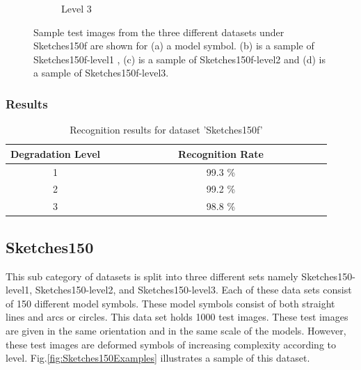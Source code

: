 \begin{figure}[h]
\begin{subfigure}[b]{0.25\textwidth}
                \caption{Level 3}
        \end{subfigure}
        \caption[Sample data from 'Sketches150f' dataset]{Sample test images from the three different datasets under Sketches150f are shown for (a) a model symbol. (b) is a sample of Sketches150f-level1 , (c)  is a sample of Sketches150f-level2 and (d) is a sample of Sketches150f-level3.}
        \label{fig:Sketches150fExamples}
\end{figure}


\subsubsection{Results}
\begin{table}[H]
\centering
\caption{Recognition results for dataset 'Sketches150f'}
\begin{tabular}{ccccccccccccccc}
  \hline
      Degradation Level & & & & & & & & Recognition Rate \\
  \hline
     1 & & & & & & & &  99.3 \% \\
     2 & & & & & & & &  99.2 \% \\
     3 & & & & & & & &  98.8 \% \\

  \hline
\end{tabular}
\end{table}
\vspace{49.3mm}

\subsection{Sketches150}
This sub category of datasets is split into three different sets namely Sketches150-level1, Sketches150-level2, and Sketches150-level3. Each of these data sets consist of 150 different model symbols. These model symbols consist of both straight lines and arcs or circles. This data set holds 1000 test images. These test images are given in the same orientation and in the same scale of the models. However, these test images are deformed symbols of increasing complexity according to level. Fig.\ref{fig:Sketches150Examples} illustrates a sample of this dataset.

